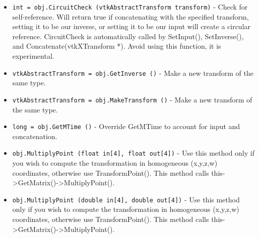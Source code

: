 \begin{itemize}
\item  \verb|int = obj.CircuitCheck (vtkAbstractTransform transform)| -  Check for self-reference.  Will return true if concatenating
 with the specified transform, setting it to be our inverse,
 or setting it to be our input will create a circular reference.
 CircuitCheck is automatically called by SetInput(), SetInverse(),
 and Concatenate(vtkXTransform *).  Avoid using this function,
 it is experimental.

\item  \verb|vtkAbstractTransform = obj.GetInverse ()| -  Make a new transform of the same type.

\item  \verb|vtkAbstractTransform = obj.MakeTransform ()| -  Make a new transform of the same type.

\item  \verb|long = obj.GetMTime ()| -  Override GetMTime to account for input and concatenation.

\item  \verb|obj.MultiplyPoint (float in[4], float out[4])| -  Use this method only if you wish to compute the transformation in
 homogeneous (x,y,z,w) coordinates, otherwise use TransformPoint().
 This method calls this->GetMatrix()->MultiplyPoint().

\item  \verb|obj.MultiplyPoint (double in[4], double out[4])| -  Use this method only if you wish to compute the transformation in
 homogeneous (x,y,z,w) coordinates, otherwise use TransformPoint().
 This method calls this->GetMatrix()->MultiplyPoint().

\end{itemize}

